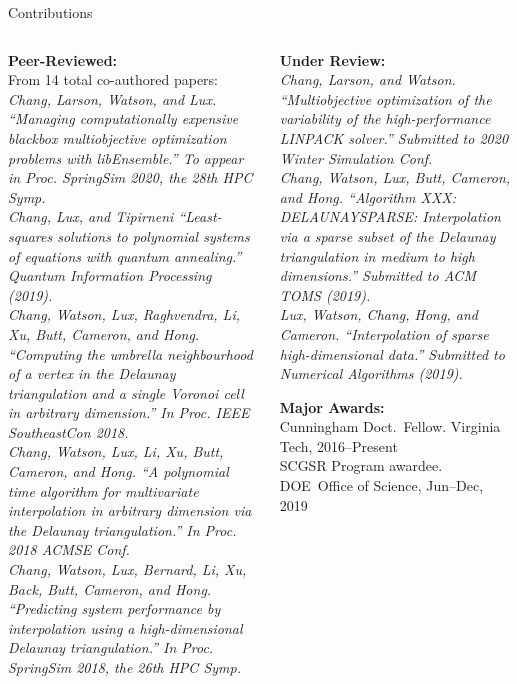 \documentclass[xcolor=dvipsnames]{beamer}
\begin{document}
\begin{frame}{Contributions}
\begin{columns}
\begin{column}{.48\textwidth}
\textbf{Peer-Reviewed:}\\
\smallskip
{\tiny
{From 14 total co-authored papers:}\\
\medskip
{\it Chang, Larson, Watson, and Lux.
``Managing computationally expensive blackbox multiobjective optimization
problems with libEnsemble.''
To appear in Proc. SpringSim 2020, the 28th HPC Symp.}\\
\medskip
{\it Chang, Lux, and Tipirneni
``Least-squares solutions to polynomial systems of
equations with quantum annealing.'' Quantum Information Processing (2019).}\\
\medskip
{\it Chang, Watson, Lux, Raghvendra, Li, Xu, Butt, Cameron, and Hong.
``Computing the umbrella neighbourhood of a vertex in
the Delaunay triangulation and a single Voronoi cell in arbitrary dimension.''
In Proc. IEEE SoutheastCon 2018.}\\
\medskip
{\it Chang, Watson, Lux, Li, Xu, Butt, Cameron, and Hong.
``A polynomial time algorithm for multivariate interpolation in arbitrary
dimension via the Delaunay triangulation.''
In Proc. 2018 ACMSE Conf.}\\
\medskip
{\it Chang, Watson, Lux, Bernard, Li, Xu, Back, Butt, Cameron, and Hong.
``Predicting system performance by interpolation using a high-dimensional Delaunay triangulation.''
In Proc. SpringSim 2018, the 26th HPC Symp.}\\
}

\end{column}
\begin{column}{.48\textwidth}
\textbf{Under Review:}\\
\smallskip
{\tiny
{\it Chang, Larson, and Watson.
``Multiobjective optimization of the variability of the high-performance
LINPACK solver.'' Submitted to 2020 Winter Simulation Conf.}\\
\smallskip
{\it Chang, Watson, Lux, Butt, Cameron, and Hong.
``Algorithm XXX: DELAUNAYSPARSE: Interpolation via a sparse subset of the
Delaunay triangulation in medium to high dimensions.''
Submitted to ACM TOMS (2019).}\\
\smallskip
{\it Lux, Watson, Chang, Hong, and Cameron.
``Interpolation of sparse high-dimensional data.''
Submitted to Numerical Algorithms (2019).}\\
}

\smallskip
\textbf{Major Awards:}\\
\smallskip
{\tiny 
{Cunningham Doct.~Fellow. Virginia Tech, 2016--Present}\\
\smallskip
{SCGSR Program awardee. DOE~Office of Science, Jun--Dec, 2019}\\
}


\end{column}
\end{columns}
\end{frame}
\end{document}
